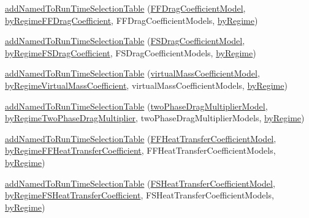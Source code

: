 \begin{DoxyCompactItemize}
\item 
\hyperlink{namespaceFoam_a8af99dfd1efcd5e7b22d931bfd9b1f07}{add\+Named\+To\+Run\+Time\+Selection\+Table} (\hyperlink{classFoam_1_1FFDragCoefficientModel}{F\+F\+Drag\+Coefficient\+Model}, \hyperlink{namespaceFoam_af81bf1c46b48683cfa1a97758c9a88ee}{by\+Regime\+F\+F\+Drag\+Coefficient}, F\+F\+Drag\+Coefficient\+Models, \hyperlink{classFoam_1_1byRegime}{by\+Regime})
\item 
\hyperlink{namespaceFoam_a742e184c4e1a139f4f53ad6661d6862e}{add\+Named\+To\+Run\+Time\+Selection\+Table} (\hyperlink{classFoam_1_1FSDragCoefficientModel}{F\+S\+Drag\+Coefficient\+Model}, \hyperlink{namespaceFoam_a05904e7dc298f47d7b89ab3e56bcf421}{by\+Regime\+F\+S\+Drag\+Coefficient}, F\+S\+Drag\+Coefficient\+Models, \hyperlink{classFoam_1_1byRegime}{by\+Regime})
\item 
\hyperlink{namespaceFoam_a41eb49f4772d802035bff9ecb04daf61}{add\+Named\+To\+Run\+Time\+Selection\+Table} (\hyperlink{classFoam_1_1virtualMassCoefficientModel}{virtual\+Mass\+Coefficient\+Model}, \hyperlink{namespaceFoam_a710fc9b4691ef70d9bc2552dcdd314f9}{by\+Regime\+Virtual\+Mass\+Coefficient}, virtual\+Mass\+Coefficient\+Models, \hyperlink{classFoam_1_1byRegime}{by\+Regime})
\item 
\hyperlink{namespaceFoam_a804d4da78862afb8e192d8f5d0bc0106}{add\+Named\+To\+Run\+Time\+Selection\+Table} (\hyperlink{classFoam_1_1twoPhaseDragMultiplierModel}{two\+Phase\+Drag\+Multiplier\+Model}, \hyperlink{namespaceFoam_a85c970e588825086eba5389c52020729}{by\+Regime\+Two\+Phase\+Drag\+Multiplier}, two\+Phase\+Drag\+Multiplier\+Models, \hyperlink{classFoam_1_1byRegime}{by\+Regime})
\item 
\hyperlink{namespaceFoam_a4b7ad4384b875ad93b69f5aed280878f}{add\+Named\+To\+Run\+Time\+Selection\+Table} (\hyperlink{classFoam_1_1FFHeatTransferCoefficientModel}{F\+F\+Heat\+Transfer\+Coefficient\+Model}, \hyperlink{namespaceFoam_a931102c7c61e686c7aaecc790c34bfe5}{by\+Regime\+F\+F\+Heat\+Transfer\+Coefficient}, F\+F\+Heat\+Transfer\+Coefficient\+Models, \hyperlink{classFoam_1_1byRegime}{by\+Regime})
\item 
\hyperlink{namespaceFoam_a429bfa504c604c49f2499d9f09fab11f}{add\+Named\+To\+Run\+Time\+Selection\+Table} (\hyperlink{classFoam_1_1FSHeatTransferCoefficientModel}{F\+S\+Heat\+Transfer\+Coefficient\+Model}, \hyperlink{namespaceFoam_a58cd69873671ef15ae6cdbab25c15f74}{by\+Regime\+F\+S\+Heat\+Transfer\+Coefficient}, F\+S\+Heat\+Transfer\+Coefficient\+Models, \hyperlink{classFoam_1_1byRegime}{by\+Regime})
\item 

\end{DoxyCompactItemize}
